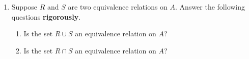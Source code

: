 \documentclass[12pt]{article}
\renewcommand{\emph}[1]{\textsf{\textbf{#1}}}
\newcommand{\R}{\mathbb{R}}
\begin{document}
\begin{enumerate}
\begin{enumerate}
	\vfill
	\item Let $R$ be the set of differentiable functions $f:\R \to \R$ defined by  by $f(x) R g(x)$ if $f'(x)=g'(x).$
	\vfill
	\end{enumerate}
\item Suppose $R$ and $S$ are two equivalence relations on $A$. Answer the following questions \emph{rigorously}. 
	\begin{enumerate}
	\item Is the set $R \cup S$ an equivalence relation on $A$?
	\vfill
	\item Is the set $R \cap S$ an equivalence relation on $A$?
	\vfill
	\vfill
	\end{enumerate}	
\end{enumerate}
\end{document}
